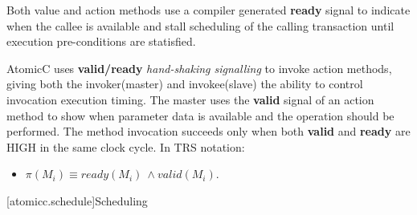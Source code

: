 Both value and action methods use a compiler generated \textbf{ready} signal
to indicate when the callee is available and
stall scheduling of the calling transaction until
execution pre-conditions are statisfied.

AtomicC uses \textbf{valid/ready} \textit{hand-shaking signalling}
\cite{Fletcher2009, AXISpec} to invoke action methods,
giving both the invoker(master) and invokee(slave) the ability to control invocation
execution timing.
The master uses the \textbf{valid} signal
of an action method to show when parameter data is available
and the operation should be performed.
The method invocation succeeds only when
both \textbf{valid} and \textbf{ready} are HIGH in the same clock cycle.
\newline
In TRS notation\cite[p.~22]{Hoe:Thesis}:
\begin{itemize}[label= ]
\item $\pi(M_{i}) \equiv ready(M_{i})\ \wedge valid(M_{i})$.
\end{itemize}

[atomicc.schedule]{Scheduling}

